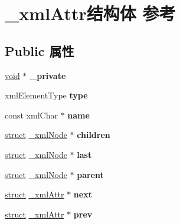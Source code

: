 \hypertarget{struct__xml_attr}{}\section{\+\_\+xml\+Attr结构体 参考}
\label{struct__xml_attr}
\subsection*{Public 属性}
\begin{DoxyCompactItemize}
\item 
\mbox{\label{struct__xml_attr_a80c0c3cbec280867b44184c8324ad7a0}} 
\hyperlink{interfacevoid}{void} $\ast$ {\bfseries \+\_\+private}
\item 
\mbox{\label{struct__xml_attr_a6ea09ec52d7c7a53d672ecc0883daf68}} 
xml\+Element\+Type {\bfseries type}
\item 
\mbox{\label{struct__xml_attr_ac3cd8a335c95c1177694a0a7f54cc4bd}} 
const xml\+Char $\ast$ {\bfseries name}
\item 
\mbox{\label{struct__xml_attr_a0ce573bf6900760b1197d18b87a58355}} 
\hyperlink{interfacestruct}{struct} \hyperlink{struct__xml_node}{\+\_\+xml\+Node} $\ast$ {\bfseries children}
\item 
\mbox{\label{struct__xml_attr_a323adbb35f22840ea387a458d534eefa}} 
\hyperlink{interfacestruct}{struct} \hyperlink{struct__xml_node}{\+\_\+xml\+Node} $\ast$ {\bfseries last}
\item 
\mbox{\label{struct__xml_attr_aa429db5b123faf9f5dfde989a7fc912d}} 
\hyperlink{interfacestruct}{struct} \hyperlink{struct__xml_node}{\+\_\+xml\+Node} $\ast$ {\bfseries parent}
\item 
\mbox{\label{struct__xml_attr_a4a72c119c75d1b8b6247ad9c7b6e46a7}} 
\hyperlink{interfacestruct}{struct} \hyperlink{struct__xml_attr}{\+\_\+xml\+Attr} $\ast$ {\bfseries next}
\item 
\mbox{\label{struct__xml_attr_aaed75b2ddf6ebbe013043a60368344f3}} 
\hyperlink{interfacestruct}{struct} \hyperlink{struct__xml_attr}{\+\_\+xml\+Attr} $\ast$ {\bfseries prev}

\end{DoxyCompactItemize}
